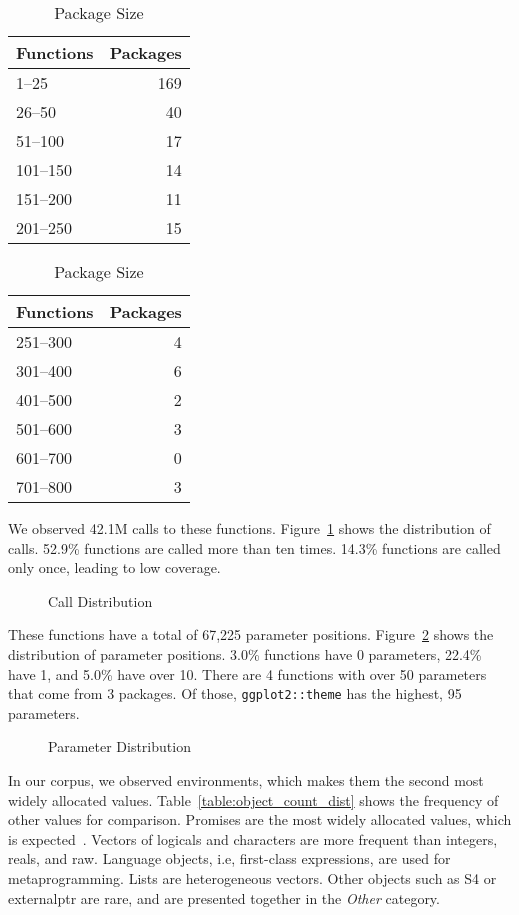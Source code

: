 \documentclass[10pt,review,sigplan,authorversion=true]{acmart}
\begin{document}
\begin{table}[!h]
  \vspace{-2mm}
  \small
  \caption{Package Size} \label{table:packsize}
  \centering
  \begin{tabular}{lr}
    \toprule
    \bf Functions&\bf Packages\\
    \midrule
    1--25&169\\
    26--50&40\\
    51--100&17\\
    101--150&14\\
    151--200&11\\
    201--250&15\\
    \bottomrule
  \end{tabular}
  \quad
  \begin{tabular}{lr}
    \toprule
    \bf Functions&\bf Packages\\
    \midrule
    251--300&4\\
    301--400&6\\
    401--500&2\\
    501--600&3\\
    601--700&0\\
    701--800&3\\
    \bottomrule
  \end{tabular}
\end{table}

We observed 42.1M calls to these functions. Figure~\ref{fig:calldist} shows the
distribution of calls. 52.9\% functions are called more than ten times. 14.3\%
functions are called only once, leading to low coverage.

\begin{figure}[!h]
  \centering
  
  \caption{Call Distribution}
  \label{fig:calldist}
\end{figure}

These functions have a total of 67,225 parameter positions.
Figure~\ref{fig:paramdist} shows the distribution of parameter positions. 3.0\%
functions have 0 parameters, 22.4\% have 1, and 5.0\% have over 10. There are 4
functions with over 50 parameters that come from 3 packages. Of those,
\texttt{ggplot2::theme} has the highest, 95 parameters.

\begin{figure}[!h]
  \centering
  
  \caption{Parameter Distribution}
  \label{fig:paramdist}
\end{figure}

In our corpus, we observed \ObjCntEnvironment environments, which makes them the
second most widely allocated values. Table~\ref{table:object_count_dist} shows
the frequency of other values for comparison. Promises are the most widely
allocated values, which is expected~\cite{oopsla19b}. Vectors of logicals and
characters are more frequent than integers, reals, and raw. Language objects,
i.e, first-class expressions, are used for metaprogramming. Lists are
heterogeneous vectors. Other objects such as S4 or externalptr are rare, and are
presented together in the \emph{Other} category.
\end{document}

